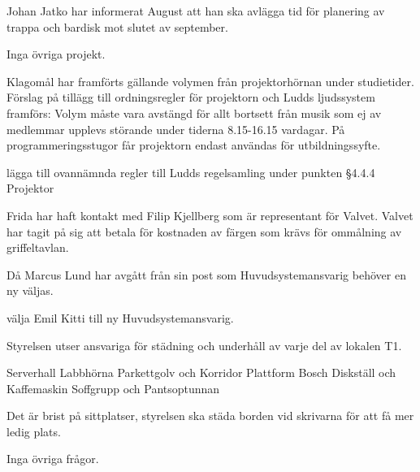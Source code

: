 \documentclass{protokoll}
\begin{document}
Johan Jatko har informerat August att han ska avlägga tid för planering av trappa och bardisk mot slutet av september.

Inga övriga projekt.

Klagomål har framförts gällande volymen från projektorhörnan under studietider. Förslag på tillägg till ordningsregler för projektorn och Ludds ljudssystem framförs: 
Volym måste vara avstängd för allt bortsett från musik som ej av medlemmar upplevs störande under tiderna 8.15-16.15 vardagar. 
På programmeringsstugor får projektorn endast användas för utbildningssyfte.

\begin{beslut}
    \att lägga till ovannämnda regler till Ludds regelsamling under punkten §4.4.4 Projektor
\end{beslut}

Frida har haft kontakt med Filip Kjellberg som är representant för Valvet. Valvet har tagit på sig att betala för kostnaden av färgen som krävs för ommålning av griffeltavlan. 

Då Marcus Lund har avgått från sin post som Huvudsystemansvarig behöver en ny väljas. 
\begin{beslut}
    \att välja Emil Kitti till ny Huvudsystemansvarig.
\end{beslut}

Styrelsen utser ansvariga för städning och underhåll av varje del av lokalen T1. 
\begin{list}
    \entry[Kitti] Serverhall 
    \entry[Jens] Labbhörna
    \entry[Frida] Parkettgolv och Korridor
    \entry[Fredrik] Plattform
    \entry[August] Bosch
    \entry[Anton] Diskställ och Kaffemaskin
    \entry[Edvin] Soffgrupp och Pantsoptunnan
\end{list}

Det är brist på sittplatser, styrelsen ska städa borden vid skrivarna för att få mer ledig plats.

Inga övriga frågor.
\end{document}
